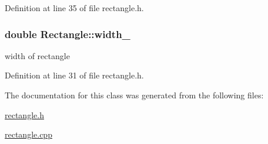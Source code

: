 Definition at line 35 of file rectangle.\+h.

\hypertarget{class_rectangle_a4a7673968f25a38762439c252b6d877d}{}
\subsubsection[{width\+\_\+}]{\setlength{\rightskip}{0pt plus 5cm}double Rectangle\+::width\+\_\+\hspace{0.3cm}{\ttfamily [protected]}}\label{class_rectangle_a4a7673968f25a38762439c252b6d877d}
width of rectangle 

Definition at line 31 of file rectangle.\+h.



The documentation for this class was generated from the following files\+:\begin{DoxyCompactItemize}
\item 
\hyperlink{rectangle_8h}{rectangle.\+h}\item 
\hyperlink{rectangle_8cpp}{rectangle.\+cpp}\end{DoxyCompactItemize}
